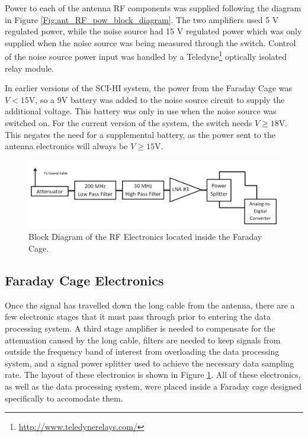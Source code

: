 Power to each of the antenna RF components was supplied following the diagram in Figure \ref{Fig:ant_RF_pow_block_diagram}. The two amplifiers used 5 V regulated power, while the noise source had 15 V regulated power which was only supplied when the noise source was being measured through the switch. Control of the noise source power input was handled by a Teledyne\footnote{\url{http://www.teledynerelays.com/}} optically isolated relay module. 

In earlier versions of the SCI-HI system, the power from the Faraday Cage was $V< 15$V, so a 9V battery was added to the noise source circuit to supply the additional voltage. This battery was only in use when the noise source was switched on. For the current version of the system, the switch needs $V \geq 18$V. This negates the need for a supplemental battery, as the power sent to the antenna electronics will always be $V \geq 15$V.  

\begin{figure}[htb]
\begin{center}
\includegraphics[width=0.9\linewidth]{SCIHI_system/figures/faraday_cage_rf_block_diagram.png}
\caption{Block Diagram of the RF Electronics located inside the Faraday Cage.}
\label{Fig:fcage_RF_block_diagram}
\end{center}
\end{figure}


\subsection{Faraday Cage Electronics}

Once the signal has travelled down the long cable from the antenna, there are a few electronic stages that it must pass through prior to entering the data processing system. A third stage amplifier is needed to compensate for the attenuation caused by the long cable, filters are needed to keep signals from outside the frequency band of interest from overloading the data processing system, and a signal power splitter used to achieve the necessary data sampling rate. The layout of these electronics is shown in Figure \ref{Fig:fcage_RF_block_diagram}. All of these electronics, as well as the data processing system, were placed inside a Faraday cage designed specifically to accomodate them. 

